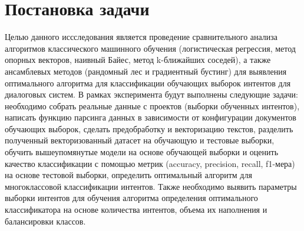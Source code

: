 \documentclass{article}
\begin{document}
\section{Постановка задачи}
Целью данного иссследования является проведение сравнительного анализа алгоритмов классического машинного обучения (логистическая регрессия, метод опорных векторов, наивный Байес, метод k-ближайших соседей), а также ансамблевых методов (рандомный лес и градиентный бустинг) для выявления оптимального алгоритма для классификации обучающих выборок интентов для диалоговых систем. В рамках эксперимента будут выполнены следующие задачи: необходимо собрать реальные данные с проектов (выборки обученных интентов), написать функцию парсинга данных в зависимости от конфигурации документов обучающих выборок, сделать предобработку и векторизацию текстов, разделить полученный векторизованный датасет на обучающую и тестовые выборки, обучить вышеупомянутые модели на основе обучающей выборки и оценить качество классификации с помощью метрик (accuracy, precision, recall, f1-мера) на основе тестовой выборки, определить оптимальный алгоритм для многоклассовой классификации интентов. Также необходимо выявить параметры выборки интентов для обучения алгоритма определения оптимального классификатора на основе количества интентов, объема их наполнения и балансировки классов. 
\end{document}
